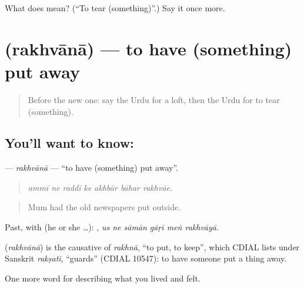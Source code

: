 \begin{tcolorbox}[breakable,colback=teal!4,colframe=teal!35!black,title={Before you move on}]
What does  mean? (\textquotedblleft{}To tear (something)\textquotedblright{}.) Say it once more.
\end{tcolorbox}
\section[\texorpdfstring{\ur{رکھوانا} (rakhvānā)}{رکھوانا (rakhvānā)}]{ (rakhvānā) — to have (something) put away}

\label{lesson:UR-C505-rakhvana}



\begin{quote}
Before the new one: say the Urdu for a loft, then the Urdu for to tear (something).
\end{quote}

\subsection*{You'll want to know: }
\textbf{} — \emph{rakhvānā} — \textquotedblleft{}to have (something) put away\textquotedblright{}.

\begin{quote}
      
\end{quote}

\begin{quote}
\emph{ammī ne raddī ke akhbār bāhar rakhvāe.}
\end{quote}

\begin{quote}
Mum had the old newspapers put outside.
\end{quote}

Past, with  (he or she …):      , \emph{us ne sāmān gāṛī meṅ rakhvāyā}.

\begin{cousinweb}
\textbf{} (\emph{rakhvānā}) is the causative of \emph{rakhnā}, \textquotedblleft{}to put, to keep\textquotedblright{}, which CDIAL lists under Sanskrit \emph{rakṣati}, \textquotedblleft{}guards\textquotedblright{} (CDIAL 10547): to have someone put a thing away.
\end{cousinweb}

\begin{grammarlens}[title={What you've built}]
One more word for describing what you lived and felt.
\end{grammarlens}

